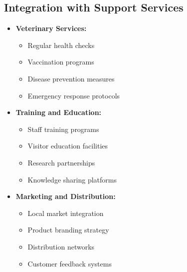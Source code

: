 \subsection{Integration with Support Services}
\begin{itemize}
    \item \textbf{Veterinary Services:}
    \begin{itemize}
        \item Regular health checks
        \item Vaccination programs
        \item Disease prevention measures
        \item Emergency response protocols
    \end{itemize}
    
    \item \textbf{Training and Education:}
    \begin{itemize}
        \item Staff training programs
        \item Visitor education facilities
        \item Research partnerships
        \item Knowledge sharing platforms
    \end{itemize}
    
    \item \textbf{Marketing and Distribution:}
    \begin{itemize}
        \item Local market integration
        \item Product branding strategy
        \item Distribution networks
        \item Customer feedback systems
    \end{itemize}
\end{itemize}

